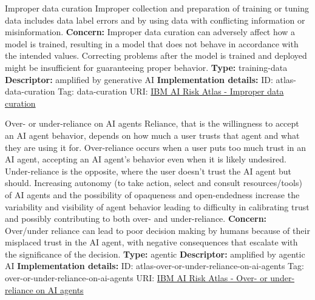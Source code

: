 \documentclass[a4paper,12pt]{article}
\begin{document}
\begin{definitionbox}{Improper data curation}
Improper collection and preparation of training or tuning data includes data label errors and by using data with conflicting information or misinformation.\newline\newline
\textbf{Concern: }Improper data curation can adversely affect how a model is trained, resulting in a model that does not behave in accordance with the intended values. Correcting problems after the model is trained and deployed might be insufficient for guaranteeing proper behavior. \newline\newline
\textbf{Type: }training-data\newline
\textbf{Descriptor: }amplified by generative AI \newline\newline
\textbf{Implementation details: } \newline
ID: atlas-data-curation \newline
Tag: data-curation \newline
URI:  \href{https://www.ibm.com/docs/en/watsonx/saas?topic=SSYOK8/wsj/ai-risk-atlas/data-curation.html}{IBM AI Risk Atlas - Improper data curation}\newline
\end{definitionbox}
\begin{definitionbox}{Over- or under-reliance on AI agents}
Reliance, that is the willingness to accept an AI agent behavior, depends on how much a user trusts that agent and what they are using it for. Over-reliance occurs when a user puts too much trust in an AI agent, accepting an AI agent's behavior even when it is likely undesired. Under-reliance is the opposite, where the user doesn't trust the AI agent but should. Increasing autonomy (to take action, select and consult resources/tools) of AI agents and the possibility of opaqueness and open-endedness increase the variability and visibility of agent behavior leading to difficulty in calibrating trust and possibly contributing to both over- and under-reliance.\newline\newline
\textbf{Concern: }Over/under reliance can lead to poor decision making by humans because of their misplaced trust in the AI agent, with negative consequences that escalate with the significance of the decision.\newline\newline
\textbf{Type: }agentic\newline
\textbf{Descriptor: }amplified by agentic AI \newline\newline
\textbf{Implementation details: } \newline
ID: atlas-over-or-under-reliance-on-ai-agents \newline
Tag: over-or-under-reliance-on-ai-agents \newline
URI:  \href{https://www.ibm.com/docs/en/watsonx/saas?topic=SSYOK8/wsj/ai-risk-atlas/over-or-under-reliance-on-ai-agents.html}{IBM AI Risk Atlas - Over- or under-reliance on AI agents}\newline
\end{definitionbox}
\end{document}
